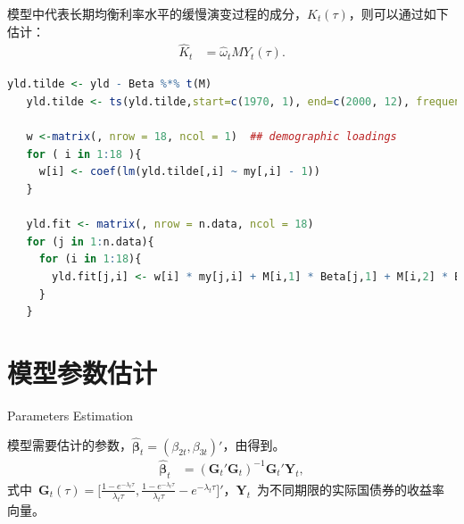  模型中代表长期均衡利率水平的缓慢演变过程的成分，$K_t(\tau)$，则可以通过如下估计：
  \begin{align}
    \hat{K}_t & = \hat{\omega}_t  MY_t(\tau).
  \end{align}
  
  \begin{lstlisting}[language=R]
   yld.tilde <- yld - Beta %*% t(M)
   yld.tilde <- ts(yld.tilde,start=c(1970, 1), end=c(2000, 12), frequency=12)
   
   w <-matrix(, nrow = 18, ncol = 1)  ## demographic loadings
   for ( i in 1:18 ){
     w[i] <- coef(lm(yld.tilde[,i] ~ my[,i] - 1))
   }
   
   yld.fit <- matrix(, nrow = n.data, ncol = 18)
   for (j in 1:n.data){
     for (i in 1:18){
       yld.fit[j,i] <- w[i] * my[j,i] + M[i,1] * Beta[j,1] + M[i,2] * Beta[j,2]
     }
   }
  \end{lstlisting}
  
\section{模型参数估计}{Parameters Estimation}

模型需要估计的参数，$\hat{\mathbf{\beta}}_t=(\beta_{2t}, \beta_{3t})'$，由得到。
 \begin{align}
    \hat{\mathbf{\beta}}_t &= ( \mathbf{G}_{t} '  \mathbf{G}_{t})^{-1}  \mathbf{G}_{t}'\mathbf{Y}_t,
 \end{align}
式中~$\mathbf{G}_{t}(\tau)=\big[
   \frac{1-e^{-\lambda_{t} \tau}} {\lambda_{t} \tau},
   \frac{1-e^{-\lambda_{t} \tau}} {\lambda_{t} \tau} - e^{-\lambda_{t} \tau} \big]'$，$\mathbf{Y}_t$~为不同期限的实际国债券的收益率向量。
   
